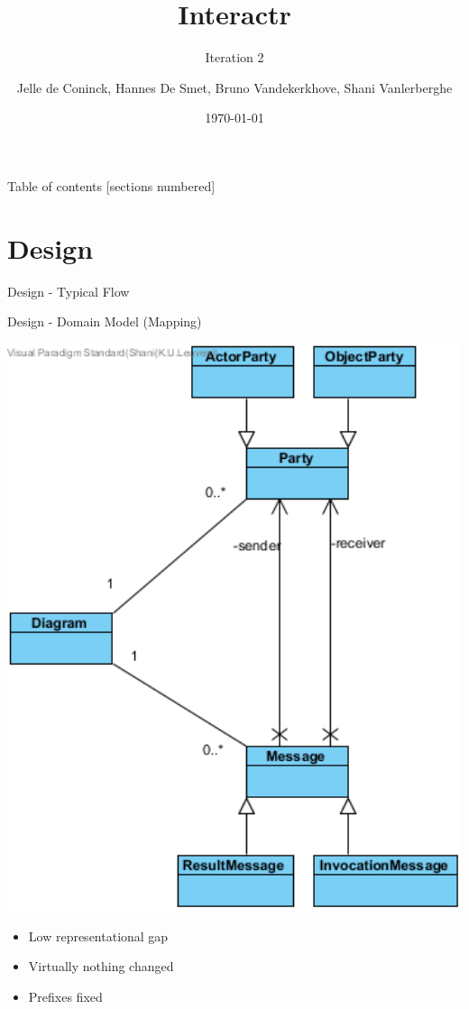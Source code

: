 \documentclass[10pt]{beamer}
\title{Interactr}
\subtitle{Iteration 2}
\date{\today}
\author{Jelle de Coninck, Hannes De Smet, Bruno Vandekerkhove, Shani Vanlerberghe}
\institute{KULeuven}
\begin{document}
\maketitle

\begin{frame}{Table of contents}
  [sections numbered]
  \tableofcontents[hideallsubsections]
\end{frame}

\section{Design}

\begin{frame}[fragile]{Design - Typical Flow}
\begin{center}

\end{center}
\end{frame}

\begin{frame}[fragile]{Design - Domain Model (Mapping)}
\noindent\begin{minipage}{0.5\textwidth}%
\includegraphics[width=1\textwidth]{domain}
\end{minipage}%
\hfill%
\begin{minipage}{0.5\textwidth}\raggedleft
\begin{itemize}
	\item Low representational gap
	\item Virtually nothing changed
	\item Prefixes fixed
	\end{itemize}
\end{minipage}
\end{frame}
\end{document}
